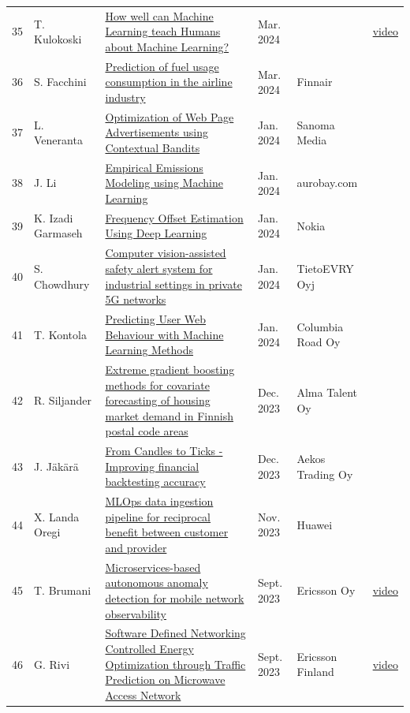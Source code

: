 \documentclass[11pt,a4paper]{article}
\begin{document}
\begin{longtable}{@{}r p{2.8cm} p{6.3cm} p{1.6cm} p{2cm} p{1.8cm}@{}}
35 & T. Kulokoski & \href{https://urn.fi/URN:NBN:fi:aalto-202403172727}{How well can Machine Learning teach Humans about Machine Learning?} & Mar. 2024 &  & \href{https://youtu.be/EcJCq9cXDA4}{video} \\
36 & S. Facchini & \href{https://urn.fi/URN:NBN:fi:aalto-202403172740}{Prediction of fuel usage consumption in the airline industry} & Mar. 2024 & Finnair &  \\
37 & L. Veneranta & \href{https://urn.fi/URN:NBN:fi:aalto-202401282006}{Optimization of Web Page Advertisements using Contextual Bandits} & Jan. 2024 & Sanoma Media &  \\
38 & J. Li & \href{https://urn.fi/URN:NBN:fi:aalto-202401281970}{Empirical Emissions Modeling using Machine Learning} & Jan. 2024 & aurobay.com &  \\
39 & K. Izadi Garmaseh & \href{https://urn.fi/URN:NBN:fi:aalto-202401282059}{Frequency Offset Estimation Using Deep Learning} & Jan. 2024 & Nokia &  \\
40 & S. Chowdhury & \href{https://urn.fi/URN:NBN:fi:aalto-202401282114}{Computer vision-assisted safety alert system for industrial settings in private 5G networks} & Jan. 2024 & TietoEVRY Oyj &  \\
41 & T. Kontola & \href{https://urn.fi/URN:NBN:fi:aalto-202401282008}{Predicting User Web Behaviour with Machine Learning Methods} & Jan. 2024 & Columbia Road Oy &  \\
42 & R. Siljander & \href{https://urn.fi/URN:NBN:fi:aalto-202312187385}{Extreme gradient boosting methods for covariate forecasting of housing market demand in Finnish postal code areas} & Dec. 2023 & Alma Talent Oy &  \\
43 & J. Jäkärä & \href{https://urn.fi/URN:NBN:fi:aalto-202312187389}{From Candles to Ticks - Improving financial backtesting accuracy} & Dec. 2023 & Aekos Trading Oy &  \\
44 & X. Landa Oregi & \href{https://urn.fi/URN:NBN:fi:aalto-202401071333}{MLOps data ingestion pipeline for reciprocal benefit between customer and provider} & Nov. 2023 & Huawei &  \\
45 & T. Brumani & \href{https://aaltodoc.aalto.fi/items/747916fb-98a1-4195-93a6-841cf0b6be71}{Microservices-based autonomous anomaly detection for mobile network observability} & Sept. 2023 & Ericsson Oy & \href{https://youtu.be/nod42G_KHok}{video} \\
46 & G. Rivi & \href{https://aaltodoc.aalto.fi/items/f3545faf-7aec-4453-b123-6be572a0ac80}{Software Defined Networking Controlled Energy Optimization through Traffic Prediction on Microwave Access Network} & Sept. 2023 & Ericsson Finland & \href{https://youtu.be/jq5Xg8Hmn9s}{video} \\

\end{longtable}
\end{document}
